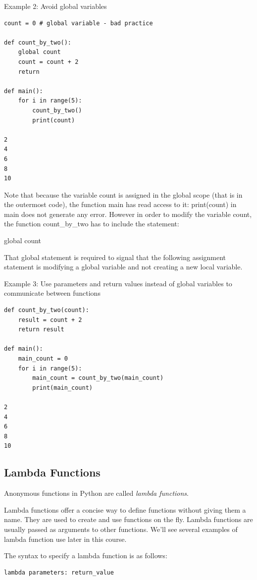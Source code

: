 \documentclass{article}
\begin{document}
Example 2:  Avoid global variables

\begin{lstlisting} 
count = 0 # global variable - bad practice

def count_by_two():
    global count
    count = count + 2
    return

def main():
    for i in range(5):
        count_by_two()
        print(count)
 
2
4
6
8
10
\end{lstlisting}

 Note that because the variable count is assigned in the global scope (that is in the outermost code), the function main has read access to it: print(count) in main does not generate any error.
However in order to modify the variable count, the function count{\_}by{\_}two has to include the statement:

global count

That global statement is required to signal that the following assignment statement is modifying a global variable and not creating a new local variable.

Example 3:  Use parameters and return values  instead of global variables to communicate between functions
 
\begin{lstlisting}
def count_by_two(count):
    result = count + 2
    return result

def main():
    main_count = 0
    for i in range(5):
        main_count = count_by_two(main_count)
        print(main_count)
 
2
4
6
8
10
\end{lstlisting}

\subsection{Lambda Functions}

Anonymous functions in Python are called \textit{lambda functions}.

Lambda functions offer a concise way to define functions without giving them a name.  They are used to create and use functions on the fly.  Lambda functions are usually passed as arguments to other functions.  We'll see several examples of lambda function use later in this course.

The syntax to specify a lambda function is as follows:

\begin{lstlisting}
lambda parameters: return_value
\end{lstlisting}
\end{document}
